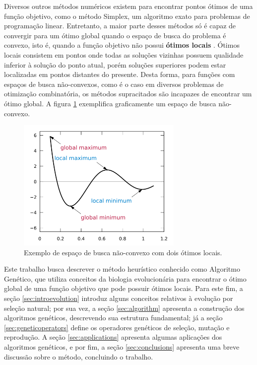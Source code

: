 \documentclass[12pt]{article}
\begin{document}
Diversos outros métodos numéricos existem para encontrar pontos ótimos de uma função objetivo, como o método Simplex, um algoritmo exato para problemas de programação linear. Entretanto, a maior parte desses métodos só é capaz de  convergir para um ótimo global quando o espaço de busca do problema é convexo, isto é, quando a função objetivo não possui \textbf{ótimos locais} \cite{Lachtermacher2009}. Ótimos locais consistem em pontos onde todas as soluções vizinhas possuem qualidade inferior à solução do ponto atual, porém soluções superiores podem estar localizadas em pontos distantes do presente. Desta forma, para funções com espaços de busca não-convexos, como é o caso em diversos problemas de otimização combinatória, os métodos supracitados são incapazes de encontrar um ótimo global. A figura \ref{fig:optima} exemplifica graficamente um espaço de busca não-convexo.

\begin{figure}[ht]
  \centering
  \includegraphics[width=8cm]{optima.png}
  \caption{Exemplo de espaço de busca não-convexo com dois ótimos locais.}
  \label{fig:optima}
\end{figure}

Este trabalho busca descrever o método heurístico conhecido como Algoritmo Genético, que utiliza conceitos da biologia evolucionária para encontrar o ótimo global de uma função objetivo que pode possuir ótimos locais. Para este fim, a seção \ref{sec:introevolution} introduz alguns conceitos relativos à evolução por seleção natural; por sua vez, a seção \ref{sec:algorithm} apresenta a construção dos algoritmos genéticos, descrevendo sua estrutura fundamental; já a seção \ref{sec:geneticoperators} define os operadores genéticos de seleção, mutação e reprodução. A seção \ref{sec:applications} apresenta algumas aplicações dos algoritmos genéticos, e por fim, a seção \ref{sec:conclusions} apresenta uma breve discussão sobre o método, concluindo o trabalho.
\end{document}
